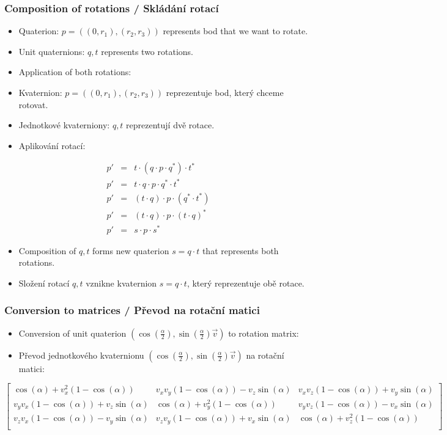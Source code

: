 \begin{frame}\frametitle{Composition of rotations / Skládání rotací}\scriptsize
\begin{itemize}
\item Quaterion: $p=((0,r_1),(r_2,r_3))$ represents bod that we want to rotate.
\item Unit quaternions: $q,t$ represents two rotations.
\item Application of both rotations:
\end{itemize}

\begin{itemize}
\item Kvaternion: $p=((0,r_1),(r_2,r_3))$ reprezentuje bod, který chceme rotovat.
\item Jednotkové kvaterniony: $q,t$ reprezentují dvě rotace.
\item Aplikování rotací:
\end{itemize}

\begin{eqnarray*}
p' &=& t\cdot (q\cdot p \cdot q^*)\cdot t^*\\
p' &=& t\cdot q\cdot p \cdot q^*\cdot t^*\\
p' &=& (t\cdot q)\cdot p \cdot (q^*\cdot t^*)\\
p' &=& (t\cdot q)\cdot p \cdot (t \cdot q)^*\\
p' &=& s \cdot p \cdot s^*
\end{eqnarray*}

\begin{itemize}
\item Composition of $q,t$ forms new quaterion $s=q\cdot t$ that represents both rotations.
\item Složení rotací $q,t$ vznikne kvaternion $s=q\cdot t$, který reprezentuje obě rotace.
\end{itemize}
\end{frame}

\begin{frame}\frametitle{Conversion to matrices / Převod na rotační matici}\scriptsize
\begin{itemize}
\item Conversion of unit quaterion $(\cos(\frac{\alpha}{2}),\sin(\frac{\alpha}{2})\vec v)$ to rotation matrix:
\item Převod jednotkového kvaternionu $(\cos(\frac{\alpha}{2}),\sin(\frac{\alpha}{2})\vec v)$ na rotační matici:
\end{itemize}
{\tiny
$$
\left[
\begin{array}{ccc} 
\cos(\alpha)+v_x^2(1-\cos(\alpha))     & v_xv_y(1-\cos(\alpha))-v_z\sin(\alpha) & v_xv_z(1-\cos(\alpha))+v_y\sin(\alpha) \\
v_yv_x(1-\cos(\alpha))+v_z\sin(\alpha) & \cos(\alpha)+v_y^2(1-\cos(\alpha))       & v_yv_z(1-\cos(\alpha))-v_x\sin(\alpha) \\
v_zv_x(1-\cos(\alpha))-v_y\sin(\alpha) & v_zv_y(1-\cos(\alpha))+v_x\sin(\alpha) & \cos(\alpha)+v_z^2(1-\cos(\alpha)) \\
\end{array}
\right]
$$
}
\end{frame}

